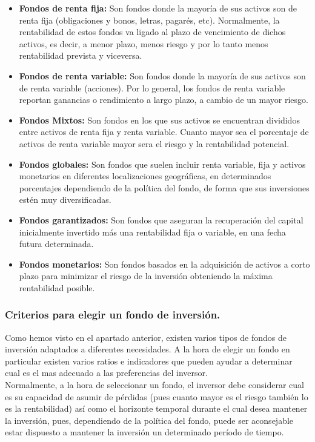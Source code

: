 \documentclass[12pt, a4paper]{article}
\begin{document}
\begin{itemize}
	\item \textbf{Fondos de renta fija:} Son fondos donde la mayoría de sus activos son de renta fija (obligaciones y bonos, letras, pagarés, etc). Normalmente, la rentabilidad de estos fondos va ligado al plazo de vencimiento de dichos activos, es decir, a menor plazo, menos riesgo y por lo tanto menos rentabilidad prevista y viceversa.
	\item \textbf{Fondos de renta variable:} Son fondos donde la mayoría de sus activos son de renta variable (acciones). Por lo general, los fondos de renta variable reportan ganancias o rendimiento a largo plazo, a cambio de un mayor riesgo.
	\item \textbf{Fondos Mixtos:} Son fondos en los que sus activos se encuentran divididos entre activos de renta fija y renta variable. Cuanto mayor sea el porcentaje de activos de renta variable mayor sera el riesgo y la rentabilidad potencial.
	\item \textbf{Fondos globales:} Son fondos que suelen incluir renta variable, fija y activos monetarios en diferentes localizaciones geográficas, en determinados porcentajes dependiendo de la política del fondo, de forma que sus inversiones estén muy diversificadas.
	\item \textbf{Fondos garantizados:} Son fondos que aseguran la recuperación del capital inicialmente invertido más una rentabilidad fija o variable, en una fecha futura determinada.
	\item \textbf{Fondos monetarios:} Son fondos basados en la adquisición de activos a corto plazo para minimizar el riesgo de la inversión obteniendo la máxima rentabilidad posible.
\end{itemize}


\subsubsection{Criterios para elegir un fondo de inversión.}


Como hemos visto en el apartado anterior, existen varios tipos de fondos de inversión adaptados a diferentes necesidades. A la hora de elegir un fondo en particular existen varios ratios e indicadores que pueden ayudar a determinar cual es el mas adecuado a las preferencias del inversor.\\

Normalmente, a la hora de seleccionar un fondo, el inversor debe considerar cual es su capacidad de asumir de pérdidas (pues cuanto mayor es el riesgo también lo es la rentabilidad) así como el horizonte temporal durante el cual desea mantener la inversión, pues, dependiendo de la política del fondo, puede ser aconsejable estar dispuesto a mantener la inversión un determinado período de tiempo.\\
\end{document}
